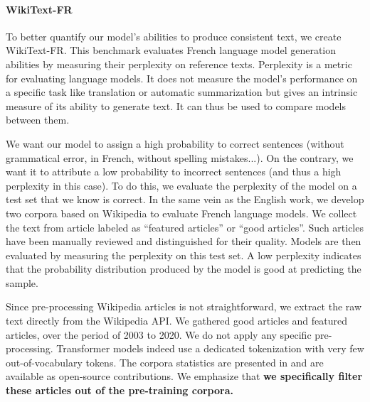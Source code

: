 \paragraph{WikiText-FR} To better quantify our model's abilities to produce consistent text, we create WikiText-FR. This benchmark evaluates French language model generation abilities by measuring their perplexity on reference texts. Perplexity is a metric for evaluating language models. It does not measure the model's performance on a specific task like translation or automatic summarization but gives an intrinsic measure of its ability to generate text. It can thus be used to compare models between them.

We want our model to assign a high probability to correct sentences (without grammatical error, in French, without spelling mistakes...). On the contrary, we want it to attribute a low probability to incorrect sentences (and thus a high perplexity in this case). To do this, we evaluate the perplexity of the model on a test set that we know is correct. In the same vein as the English work, we develop two corpora based on Wikipedia to evaluate French language models. We collect the text from article labeled as “featured articles” or “good articles”. Such articles have been manually reviewed and distinguished for their quality. Models are then evaluated by measuring the perplexity on this test set. A low perplexity indicates that the probability distribution produced by the model is good at predicting the sample.


Since pre-processing Wikipedia articles is not straightforward, we extract the raw text directly from the Wikipedia API. We gathered  good articles and  featured articles, over the period of 2003 to 2020. We do not apply any specific pre-processing. Transformer models indeed use a dedicated tokenization with very few out-of-vocabulary tokens. The corpora statistics are presented in  and are available as open-source contributions. We emphasize that \textbf{we specifically filter these articles out of the pre-training corpora.}

